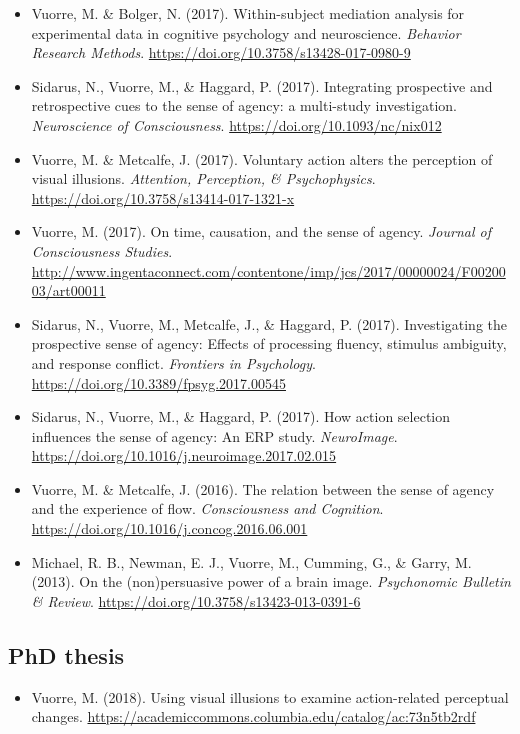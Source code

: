 \documentclass[12pt, a4paper]{article}
\newcommand{\years}[1]{\marginnote{\scriptsize #1}}
\begin{document}
\begin{itemize}
  \item \years{2017} Vuorre, M. \& Bolger, N. (2017). Within-subject mediation analysis for experimental data in cognitive psychology and neuroscience. \emph{Behavior Research Methods}. \url{https://doi.org/10.3758/s13428-017-0980-9}
  \item Sidarus, N., Vuorre, M., \& Haggard, P. (2017). Integrating prospective and retrospective cues to the sense of agency: a multi-study investigation. \emph{Neuroscience of Consciousness}. \url{https://doi.org/10.1093/nc/nix012}
  \item Vuorre, M. \& Metcalfe, J. (2017). Voluntary action alters the perception of visual illusions. \emph{Attention, Perception, \& Psychophysics}. \url{https://doi.org/10.3758/s13414-017-1321-x}
  \item Vuorre, M. (2017). On time, causation, and the sense of agency. \emph{Journal of Consciousness Studies}. \url{http://www.ingentaconnect.com/contentone/imp/jcs/2017/00000024/F0020003/art00011}
  \item Sidarus, N., Vuorre, M., Metcalfe, J., \& Haggard, P. (2017). Investigating the prospective sense of agency: Effects of processing fluency, stimulus ambiguity, and response conflict. \emph{Frontiers in Psychology}. \url{https://doi.org/10.3389/fpsyg.2017.00545}
  \item Sidarus, N., Vuorre, M., \& Haggard, P. (2017). How action selection influences the sense of agency: An ERP study. \emph{NeuroImage}. \url{https://doi.org/10.1016/j.neuroimage.2017.02.015}
  \item \years{2016} Vuorre, M. \& Metcalfe, J. (2016). The relation between the sense of agency and the experience of flow. \emph{Consciousness and Cognition}. \url{https://doi.org/10.1016/j.concog.2016.06.001}
  \item \years{2013} Michael, R. B., Newman, E. J., Vuorre, M., Cumming, G., \& Garry, M. (2013). On the (non)persuasive power of a brain image. \emph{Psychonomic Bulletin \& Review}. \url{https://doi.org/10.3758/s13423-013-0391-6}
\end{itemize}

\subsection*{PhD thesis}
\begin{itemize}
  \item \years{2018} Vuorre, M. (2018). Using visual illusions to examine action-related perceptual changes. \url{https://academiccommons.columbia.edu/catalog/ac:73n5tb2rdf}
\end{itemize}
\end{document}
